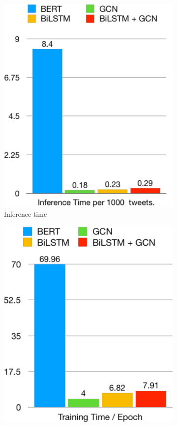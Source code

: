 \begin{figure}[tbh]
\centering
\begin{subfigure}{0.45\textwidth}
  \includegraphics[scale=0.37]{figures/Traintime}
  \caption{Inference time}
  \label{fig:test}
  \end{subfigure}\hfill{}
  \begin{subfigure}{0.45\textwidth}
    \includegraphics[scale=0.37]{figures/Testtime}

\end{subfigure}
\end{figure}
